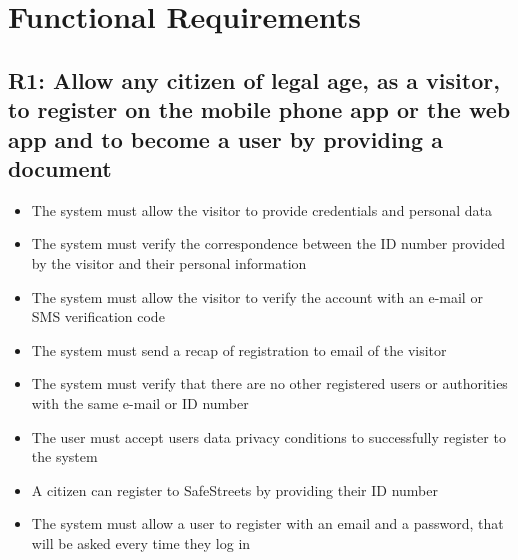 \section{Functional Requirements}

\subsection{R1: Allow any citizen of legal age, as a visitor, to register on the mobile phone app or the web app and to become a user by providing a document}
\begin{itemize}
    \item The system must allow the visitor to provide credentials and personal data
    \item The system must verify the correspondence between the ID number provided by the visitor and their personal information
    \item The system must allow the visitor to verify the account with an e-mail or SMS verification code
    \item The system must send a recap of registration to email of the visitor
    \item The system must verify that there are no other registered users or authorities with the same e-mail or ID number
    \item The user must accept users data privacy conditions to successfully register to the system
    \item A citizen can register to SafeStreets by providing their ID number
    \item The system must allow a user to register with an email and a password, that will be asked every time they log in
\end{itemize}

